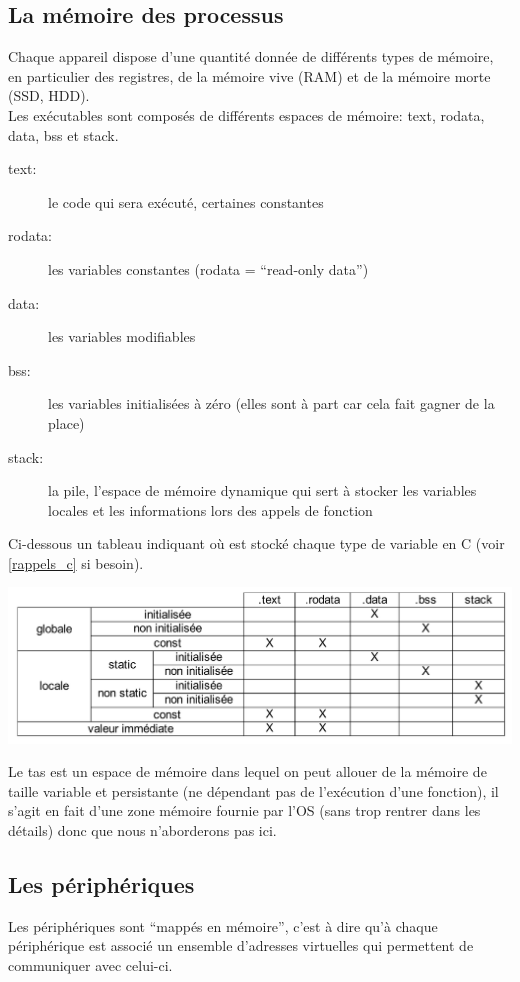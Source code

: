\documentclass[a4paper,10pt]{article} %
\begin{document}
\subsection{La mémoire des processus}
Chaque appareil dispose d'une quantité donnée de différents types de mémoire, en particulier des registres, de la mémoire vive (RAM) et de la mémoire morte (SSD, HDD).\\

Les exécutables sont composés de différents espaces de mémoire: text, rodata, data, bss et stack.

\begin{description}
    \item[text:] le code qui sera exécuté, certaines constantes
    \item[rodata:] les variables constantes (rodata = ``read-only data'')
    \item[data:] les variables modifiables
    \item[bss:] les variables initialisées à zéro (elles sont à part car cela fait gagner de la place)
    \item[stack:] la pile, l'espace de mémoire dynamique qui sert à stocker les variables locales et les informations lors des appels de fonction
\end{description}

Ci-dessous un tableau indiquant où est stocké chaque type de variable en C (voir \autoref{rappels_c}  si besoin).

\includegraphics[scale=0.35]{assets/memory.png}

Le tas est un espace de mémoire dans lequel on peut allouer de la mémoire de taille variable et persistante (ne dépendant pas de l’exécution d'une fonction), il s'agit en fait d'une zone mémoire fournie par l'OS (sans trop rentrer dans les détails) donc que nous n'aborderons pas ici.

\subsection{Les périphériques}
Les périphériques sont ``mappés en mémoire'', c'est à dire qu'à chaque périphérique est associé un ensemble d'adresses virtuelles qui permettent de communiquer avec celui-ci.\\
\end{document}
